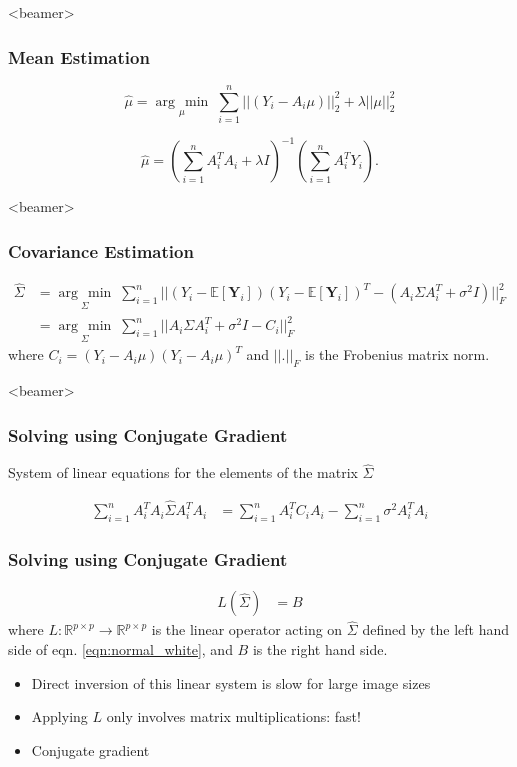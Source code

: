 \documentclass{beamer}
\newcommand{\argmin}[1]{\underset{#1}{\operatorname{arg}\,\operatorname{min}}\;}
\begin{document}

\begin{frame}<beamer>
\frametitle{Mean Estimation}

\begin{equation}
 \hat\mu = \argmin{\mu} \sum_{i=1}^n||(Y_i-A_i\mu)||_2^2 + \lambda||\mu||_2^2
\end{equation}

\begin{equation}
 \hat\mu = (\sum_{i=1}^n A_i^T A_i + \lambda I)^{-1}(\sum_{i=1}^n 
A_i^T Y_i).
\label{eq:ls_mean_sol}
\end{equation}
\end{frame}


\begin{frame}<beamer>
\frametitle{Covariance Estimation}
\begin{equation}
\begin{aligned}
\hat\Sigma 
&= \argmin{\Sigma} \sum_{i=1}^n || (Y_i - \mathbb{E}[\textbf{Y}_i]) (Y_i - \mathbb{E}[\textbf{Y}_i])^T
- (A_i \Sigma A_i^T + \sigma^2 I)||_F^2 \\
&= \argmin{\Sigma} \sum_{i=1}^n || A_i\Sigma A_i^T + \sigma^2 I - C_i  ||_F^2 
\end{aligned}
\label{eqn:ls1}
\end{equation}
where $C_i=(Y_i - A_i \mu) (Y_i - A_i \mu)^T$ and $||.||_F$ is the Frobenius matrix norm. 
\end{frame}


\begin{frame}<beamer>
\frametitle{Solving using Conjugate Gradient}
System of linear equations for the elements of the matrix $\hat \Sigma$

\begin{equation}
\begin{aligned}
\sum_{i=1}^n  A_i^T  A_i \hat \Sigma A_i^T A_i
&= \sum_{i=1}^n A_i^T C_i A_i - \sum_{i=1}^n \sigma^2 A_i^T A_i 
\end{aligned}
\label{eqn:normal_white}
\end{equation}
\frametitle{Solving using Conjugate Gradient}
\begin{equation}
\begin{aligned}
L(\hat\Sigma) 
&=  B 
\label{eqn:cg}
\end{aligned}
\end{equation}
where $L:\mathbb{R}^{p\times p} \to \mathbb{R}^{p\times p}$ is the linear operator acting on $\hat{\Sigma}$ defined by the left hand side of eqn. \ref{eqn:normal_white}, and $B$ is the right hand side.

\begin{itemize}
 \item Direct inversion of this linear system is slow for large image sizes
 \item Applying $L$ only involves matrix multiplications: fast!
 \item Conjugate gradient 
\end{itemize}

\end{frame}
\end{document}
